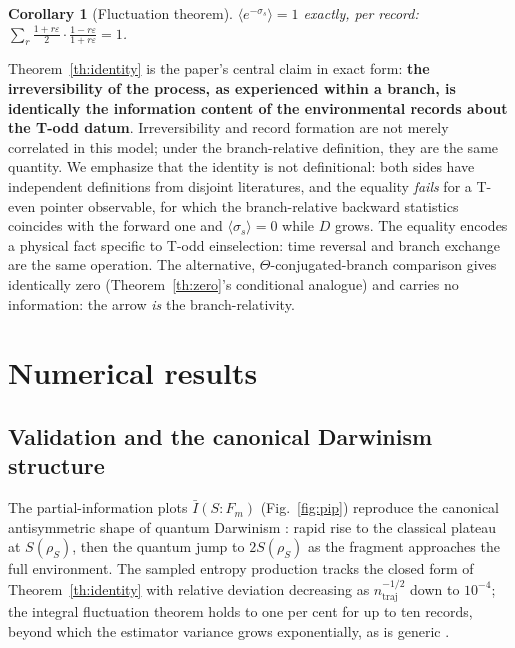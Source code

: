 \documentclass[11pt]{article}
\newtheorem{corollary}{Corollary}
\begin{document}
\begin{corollary}[Fluctuation theorem]
$\langle e^{-\sigma_s}\rangle = 1$ exactly, per record:
$\sum_r \frac{1+r\varepsilon}{2}\cdot\frac{1-r\varepsilon}{1+r\varepsilon} = 1$.
\end{corollary}

Theorem~\ref{th:identity} is the paper's central claim in exact form: \textbf{the irreversibility of the process, as experienced within a branch, is identically the information content of the environmental records about the T-odd datum}. Irreversibility and record formation are not merely correlated in this model; under the branch-relative definition, they are the same quantity. We emphasize that the identity is not definitional: both sides have independent definitions from disjoint literatures, and the equality \emph{fails} for a T-even pointer observable, for which the branch-relative backward statistics coincides with the forward one and $\langle\sigma_s\rangle=0$ while $D$ grows. The equality encodes a physical fact specific to T-odd einselection: time reversal and branch exchange are the same operation. The alternative, $\Theta$-conjugated-branch comparison gives identically zero (Theorem~\ref{th:zero}'s conditional analogue) and carries no information: the arrow \emph{is} the branch-relativity.

\section{Numerical results}\label{sec:numerics}

\subsection{Validation and the canonical Darwinism structure}

The partial-information plots $\bar I(S{:}F_m)$ (Fig.~\ref{fig:pip}) reproduce the canonical antisymmetric shape of quantum Darwinism \cite{Riedel2012}: rapid rise to the classical plateau at $S(\rho_S)$, then the quantum jump to $2S(\rho_S)$ as the fragment approaches the full environment. The sampled entropy production tracks the closed form of Theorem~\ref{th:identity} with relative deviation decreasing as $n_{\mathrm{traj}}^{-1/2}$ down to $10^{-4}$; the integral fluctuation theorem holds to one per cent for up to ten records, beyond which the estimator variance grows exponentially, as is generic \cite{Landi2021}.
\end{document}
